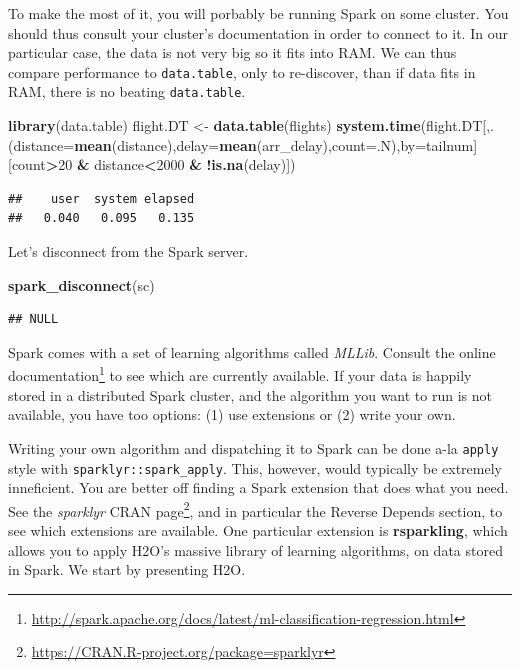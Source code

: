\documentclass[]{book}
\newenvironment{Shaded}{\begin{snugshade}}{\end{snugshade}}
\newcommand{\DataTypeTok}[1]{\textcolor[rgb]{0.13,0.29,0.53}{#1}}
\newcommand{\DecValTok}[1]{\textcolor[rgb]{0.00,0.00,0.81}{#1}}
\newcommand{\KeywordTok}[1]{\textcolor[rgb]{0.13,0.29,0.53}{\textbf{#1}}}
\newcommand{\NormalTok}[1]{#1}
\newcommand{\OperatorTok}[1]{\textcolor[rgb]{0.81,0.36,0.00}{\textbf{#1}}}
\newcommand{\StringTok}[1]{\textcolor[rgb]{0.31,0.60,0.02}{#1}}
\renewcommand{\href}[2]{#2\footnote{\url{#1}}}
\theoremstyle{definition}
\theoremstyle{definition}
\theoremstyle{definition}
\theoremstyle{remark}
\begin{document}
To make the most of it, you will porbably be running Spark on some cluster.
You should thus consult your cluster's documentation in order to connect to it.
In our particular case, the data is not very big so it fits into RAM.
We can thus compare performance to \texttt{data.table}, only to re-discover, than if data fits in RAM, there is no beating \texttt{data.table}.

\begin{Shaded}
\begin{Highlighting}[]
\KeywordTok{library}\NormalTok{(data.table)}
\NormalTok{flight.DT <-}\StringTok{ }\KeywordTok{data.table}\NormalTok{(flights)}
\KeywordTok{system.time}\NormalTok{(flight.DT[,.(}\DataTypeTok{distance=}\KeywordTok{mean}\NormalTok{(distance),}\DataTypeTok{delay=}\KeywordTok{mean}\NormalTok{(arr_delay),}\DataTypeTok{count=}\NormalTok{.N),}\DataTypeTok{by=}\NormalTok{tailnum][count}\OperatorTok{>}\DecValTok{20} \OperatorTok{&}\StringTok{ }\NormalTok{distance}\OperatorTok{<}\DecValTok{2000} \OperatorTok{&}\StringTok{ }\OperatorTok{!}\KeywordTok{is.na}\NormalTok{(delay)])}
\end{Highlighting}
\end{Shaded}

\begin{verbatim}
##    user  system elapsed 
##   0.040   0.095   0.135
\end{verbatim}

Let's disconnect from the Spark server.

\begin{Shaded}
\begin{Highlighting}[]
\KeywordTok{spark_disconnect}\NormalTok{(sc)}
\end{Highlighting}
\end{Shaded}

\begin{verbatim}
## NULL
\end{verbatim}

Spark comes with a set of learning algorithms called \emph{MLLib}.
Consult the \href{http://spark.apache.org/docs/latest/ml-classification-regression.html}{online documentation} to see which are currently available.
If your data is happily stored in a distributed Spark cluster, and the algorithm you want to run is not available, you have too options:
(1) use extensions or (2) write your own.

Writing your own algorithm and dispatching it to Spark can be done a-la \texttt{apply} style with \texttt{sparklyr::spark\_apply}. This, however, would typically be extremely inneficient. You are better off finding a Spark extension that does what you need.
See the \emph{sparklyr} \href{https://CRAN.R-project.org/package=sparklyr}{CRAN page}, and in particular the Reverse Depends section, to see which extensions are available.
One particular extension is \textbf{rsparkling}, which allows you to apply H2O's massive library of learning algorithms, on data stored in Spark.
We start by presenting H2O.
\end{document}
